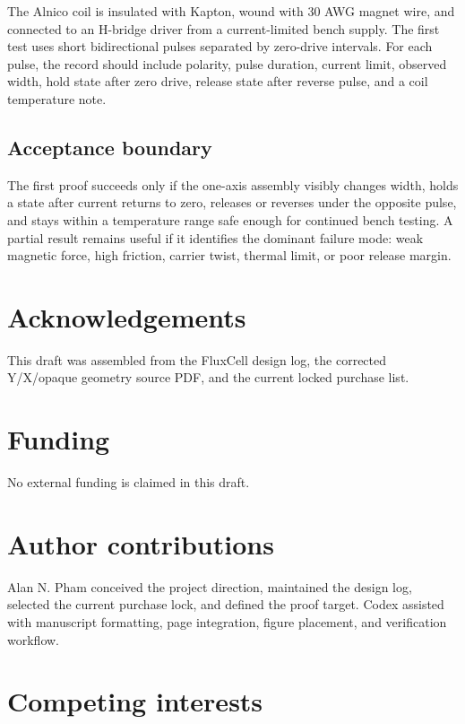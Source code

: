 \documentclass[12pt,letterpaper]{article}
\begin{document}
The Alnico coil is insulated with Kapton, wound with 30 AWG magnet wire, and connected to an H-bridge driver from a current-limited bench supply. The first test uses short bidirectional pulses separated by zero-drive intervals. For each pulse, the record should include polarity, pulse duration, current limit, observed width, hold state after zero drive, release state after reverse pulse, and a coil temperature note.

\subsection{Acceptance boundary}

The first proof succeeds only if the one-axis assembly visibly changes width, holds a state after current returns to zero, releases or reverses under the opposite pulse, and stays within a temperature range safe enough for continued bench testing. A partial result remains useful if it identifies the dominant failure mode: weak magnetic force, high friction, carrier twist, thermal limit, or poor release margin.

\section{Acknowledgements}

This draft was assembled from the FluxCell design log, the corrected Y/X/opaque geometry source PDF, and the current locked purchase list.

\section{Funding}

No external funding is claimed in this draft.

\section{Author contributions}

Alan N. Pham conceived the project direction, maintained the design log, selected the current purchase lock, and defined the proof target. Codex assisted with manuscript formatting, page integration, figure placement, and verification workflow.

\section{Competing interests}
\end{document}
